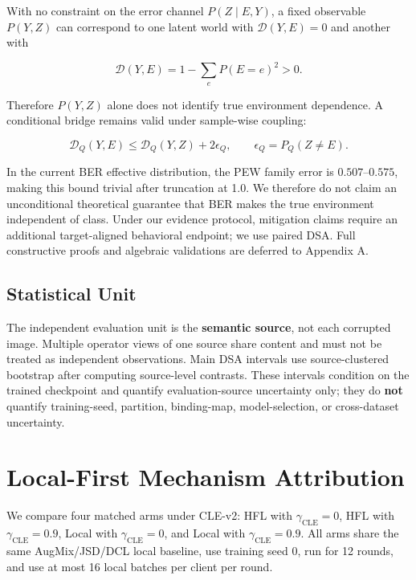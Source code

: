 \documentclass[10pt,twocolumn]{article}
\begin{document}
With no constraint on the error channel \(P(Z\mid E,Y)\), a fixed observable \(P(Y,Z)\) can correspond to one latent world with \(\mathcal D(Y,E)=0\) and another with

\[
\mathcal D(Y,E)=1-\sum_eP(E=e)^2>0.
\]

Therefore \(P(Y,Z)\) alone does not identify true environment dependence. A conditional bridge remains valid under sample-wise coupling:

\[
\mathcal D_Q(Y,E)\le
\mathcal D_Q(Y,Z)+2\epsilon_Q,
\qquad
\epsilon_Q=P_Q(Z\neq E).
\]

In the current BER effective distribution, the PEW family error is \(0.507\)--\(0.575\), making this bound trivial after truncation at 1.0. We therefore do not claim an unconditional theoretical guarantee that BER makes the true environment independent of class. Under our evidence protocol, mitigation claims require an additional target-aligned behavioral endpoint; we use paired DSA. Full constructive proofs and algebraic validations are deferred to Appendix A.

\subsection{Statistical Unit}

The independent evaluation unit is the \textbf{semantic source}, not each corrupted image. Multiple operator views of one source share content and must not be treated as independent observations. Main DSA intervals use source-clustered bootstrap after computing source-level contrasts. These intervals condition on the trained checkpoint and quantify evaluation-source uncertainty only; they do \textbf{not} quantify training-seed, partition, binding-map, model-selection, or cross-dataset uncertainty.

\section{Local-First Mechanism Attribution}

We compare four matched arms under CLE-v2: HFL with \(\gamma_{\mathrm{CLE}}=0\), HFL with \(\gamma_{\mathrm{CLE}}=0.9\), Local with \(\gamma_{\mathrm{CLE}}=0\), and Local with \(\gamma_{\mathrm{CLE}}=0.9\). All arms share the same AugMix/JSD/DCL local baseline, use training seed 0, run for 12 rounds, and use at most 16 local batches per client per round.
\end{document}
